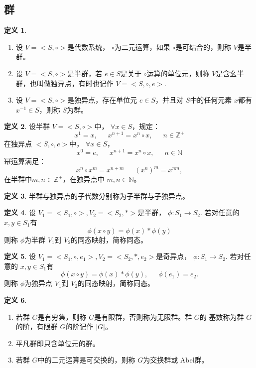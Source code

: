 \documentclass[a4paper,11pt]{article}%
\theoremstyle{remark}
\theoremstyle{remark}
\theoremstyle{definition}
\theoremstyle{definition}
\newtheorem*{definition}{定义}
\theoremstyle{plain}
\newcommand*{\abs}[1]{\lvert #1 \rvert}
\begin{document}
\subsection{群}
\begin{definition}
    \begin{enumerate}
    \item 设 $V=<S,\circ>$是代数系统， $\circ$为二元运算，如果 $\circ$是可结合的，则称 $V$是半群。
        \item 设 $V=<S,\circ>$是半群，若 $e\in S$是关于 $\circ$运算的单位元，则称 $V$是含幺半群，也叫做独异点，有时也记作 $V=<S,\circ,e>.$
        \item 设 $V=<S,\circ>$是独异点，存在单位元 $e\in S$，并且对 $S$中的任何元素 $x$都有 $x^{-1}\in S$，则称 $S$为群。
    \end{enumerate}
\end{definition}
\begin{definition}
    设半群 $V=<S,\circ>$中， $\forall x\in S$，规定：
    \[x^1=x,\phantom{111}x^{n+1}=x^n\circ x,\phantom{111}n\in \mathbb{Z}^+\]
    在独异点  $<S,\circ,e>$中， $\forall x\in S$，
    \[x^0=e,\phantom{111}x^{n+1}=x^n\circ x,\phantom{111}n\in \mathbb{N}\]
    幂运算满足：
    \[x^n\circ x^m=x^{n+m}\phantom{111}(x^n)^m=x^{nm},\]
    在半群中$m,n\in \mathbb{Z}^+$，在独异点中 $m,n\in \mathbb{N}$。
\end{definition}
\begin{definition}
    半群与独异点的子代数分别称为子半群与子独异点。
\end{definition}
\begin{definition}
    设 $V_1=<S_1,\circ>,V_2=<S_2,*>$是半群， $\phi:S_1\rightarrow S_2.$
    若对任意的 $x,y\in S_1$有
    \[\phi(x\circ y)=\phi(x)*\phi(y)\]
    则称 $\phi$为半群 $V_1$到 $V_2$的同态映射，简称同态。
\end{definition}
\begin{definition}
    设 $V_1=<S_1,\circ,e_1>,V_2=<S_2,*,e_2>$是奇异点， $\phi:S_1\rightarrow S_2.$
    若对任意的 $x,y\in S_1$有
    \[\phi(x\circ y)=\phi(x)*\phi(y),\phantom{111}\phi(e_1)=e_2.\]
    则称 $\phi$为独异点 $V_1$到 $V_2$的同态映射，简称同态。
\end{definition}
\begin{definition}
    \begin{enumerate}
        \item 若群 $G$是有穷集，则称 $G$是有限群，否则称为无限群。群 $G$的 基数称为群 $G$的阶，有限群 $G$的阶记作 $\abs{G}$。
        \item 平凡群即只含单位元的群。
        \item 若群 $G$中的二元运算是可交换的，则称 $G$为交换群或 Abel群。
    \end{enumerate}
\end{definition}
\end{document}
